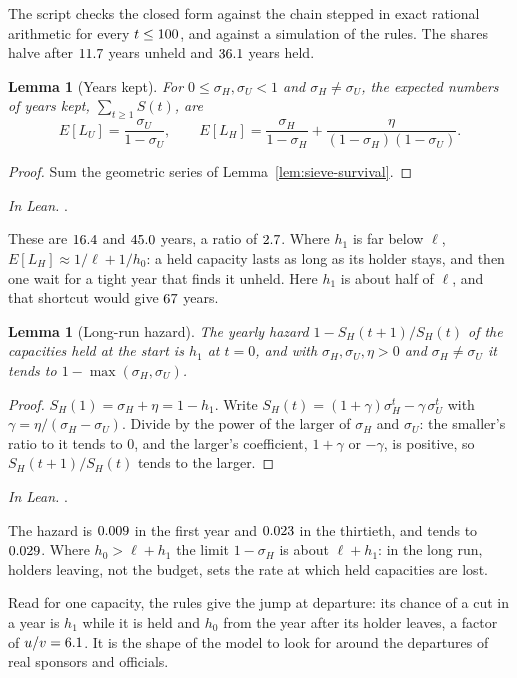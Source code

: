 \documentclass[11pt]{amsart}
\makeatletter
\newcounter{lemma@item}
\theoremstyle{plain}
\newtheorem{lemma}[lemma@item]{Lemma}
\newcommand{\inlean}[1]{\par\noindent\textit{In Lean.} #1\par\medskip}
\makeatother
\begin{document}
The script checks the closed form against the chain stepped in exact rational arithmetic for every $t\le100$, and against a simulation of the rules. The shares halve after $11.7$ years unheld and $36.1$ years held.

\begin{lemma}[Years kept]\label{lem:sieve-years}
For $0\le\sigma_H,\sigma_U<1$ and $\sigma_H\ne\sigma_U$, the expected numbers of years kept, $\sum_{t\ge1}S(t)$, are
\[
E[L_U]=\frac{\sigma_U}{1-\sigma_U},\qquad E[L_H]=\frac{\sigma_H}{1-\sigma_H}+\frac{\eta}{(1-\sigma_H)(1-\sigma_U)}.
\]
\end{lemma}
\begin{proof}
Sum the geometric series of Lemma~\ref{lem:sieve-survival}.
\end{proof}
\inlean{.}

These are $16.4$ and $45.0$ years, a ratio of $2.7$. Where $h_1$ is far below $\ell$, $E[L_H]\approx1/\ell+1/h_0$: a held capacity lasts as long as its holder stays, and then one wait for a tight year that finds it unheld. Here $h_1$ is about half of $\ell$, and that shortcut would give $67$ years.

\begin{lemma}[Long-run hazard]\label{lem:sieve-hazard}
The yearly hazard $1-S_H(t+1)/S_H(t)$ of the capacities held at the start is $h_1$ at $t=0$, and with $\sigma_H,\sigma_U,\eta>0$ and $\sigma_H\ne\sigma_U$ it tends to $1-\max(\sigma_H,\sigma_U)$.
\end{lemma}
\begin{proof}
$S_H(1)=\sigma_H+\eta=1-h_1$. Write $S_H(t)=(1+\gamma)\sigma_H^t-\gamma\,\sigma_U^t$ with $\gamma=\eta/(\sigma_H-\sigma_U)$. Divide by the power of the larger of $\sigma_H$ and $\sigma_U$: the smaller's ratio to it tends to $0$, and the larger's coefficient, $1+\gamma$ or $-\gamma$, is positive, so $S_H(t+1)/S_H(t)$ tends to the larger.
\end{proof}
\inlean{.}

The hazard is $0.009$ in the first year and $0.023$ in the thirtieth, and tends to $0.029$. Where $h_0>\ell+h_1$ the limit $1-\sigma_H$ is about $\ell+h_1$: in the long run, holders leaving, not the budget, sets the rate at which held capacities are lost.

Read for one capacity, the rules give the jump at departure: its chance of a cut in a year is $h_1$ while it is held and $h_0$ from the year after its holder leaves, a factor of $u/v=6.1$. It is the shape of the model to look for around the departures of real sponsors and officials.
\end{document}
